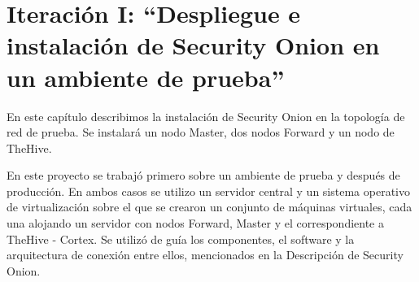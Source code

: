\chapter{\Large Iteración I: “Despliegue e instalación de Security Onion en un ambiente de prueba”}
    En este capítulo describimos la instalación de Security Onion en la topología de red de prueba. Se instalará un nodo Master, dos nodos Forward y un nodo de TheHive. \par
    En este proyecto se trabajó primero sobre un ambiente de prueba y después de producción. En ambos casos se utilizo un servidor central y un sistema operativo de virtualización sobre el que se crearon un conjunto de máquinas virtuales, cada una alojando un servidor con nodos Forward, Master y el correspondiente a TheHive - Cortex. Se utilizó de guía los componentes, el software y la arquitectura de conexión entre ellos, mencionados en la Descripción de Security Onion.

